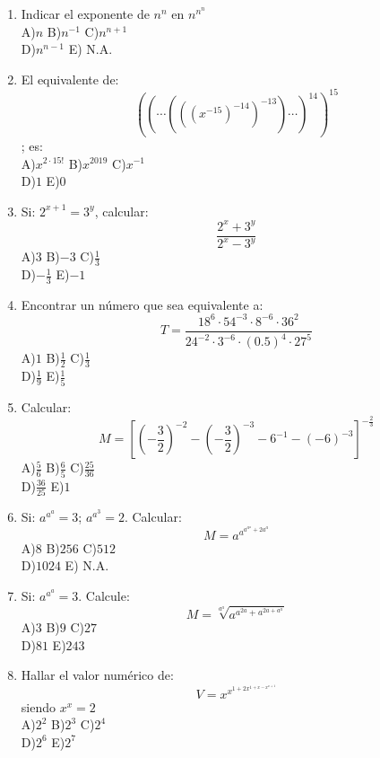 \documentclass[
  10pt,
]{article}
\begin{document}
\begin{enumerate}
  \textbf{TAREA DOMICILIARIA}
\item
  Indicar el exponente de \(n^{n}\) en \(n^{n^{n}}\)\\
  A)\(n\) B)\(n^{- 1}\) C)\(n^{n + 1}\)\\
  D)\(n^{n - 1}\) E)\(\text{ N.A.}\)
\item
  El equivalente de:\\
  \[\left( \left( \cdots\left( \left( \left( x^{- 15} \right)^{- 14} \right)^{- 13} \right)\cdots \right)^{14} \right)^{15}
  \]; es:\\
  A)\(x^{2 \cdot 15!}\) B)\(x^{2019}\) C)\(x^{- 1}\)\\
  D)\(1\) E)\(0\)
\item
  Si: \(2^{x + 1} = 3^{y}\), calcular:\\
  \[\frac{2^{x} + 3^{y}}{2^{x} - 3^{y}}
  \]A)\(3\) B)\(- 3\) C)\(\frac{1}{3}\)\\
  D)\(- \frac{1}{3}\) E)\(- 1\)
\item
  Encontrar un número que sea equivalente a:\\
  \[T = \frac{18^{6} \cdot 54^{- 3} \cdot 8^{- 6} \cdot 36^{2}}{24^{- 2} \cdot 3^{- 6} \cdot (0.5)^{4} \cdot 27^{5}}
  \]A)\(1\) B)\(\frac{1}{2}\) C)\(\frac{1}{3}\)\\
  D)\(\frac{1}{9}\) E)\(\frac{1}{5}\)
\item
  Calcular:\\
  \[M = \left\lbrack \left( - \frac{3}{2} \right)^{- 2} - \left( - \frac{3}{2} \right)^{- 3} - 6^{- 1} - ( - 6)^{- 3} \right\rbrack^{- \frac{2}{3}}
  \]A)\(\frac{5}{6}\) B)\(\frac{6}{5}\) C)\(\frac{25}{36}\)\\
  D)\(\frac{36}{25}\) E)\(1\)
\item
  Si: \(a^{a^{a}} = 3\); \(a^{a^{3}} = 2\). Calcular:\\
  \[M = a^{a^{a^{a^{a}} + 2a^{a}}}
  \]A)\(8\) B)\(256\) C)\(512\)\\
  D)\(1024\) E)\(\text{ N.A.}\)
\item
  Si: \(a^{a^{a}} = 3\). Calcule:\\
  \[M = \sqrt[a^{a}]{a^{a^{2a} + a^{2a + a^{a}}}}
  \]A)\(3\) B)\(9\) C)\(27\)\\
  D)\(81\) E)\(243\)
\item
  Hallar el valor numérico de:\\
  \[V = x^{x^{1 + 2x^{1 + x - x^{x + 1}}}}
  \] siendo \(x^{x} = 2\)\\
  A)\(2^{2}\) B)\(2^{3}\) C)\(2^{4}\)\\
  D)\(2^{6}\) E)\(2^{7}\)

\end{enumerate}
\end{document}
